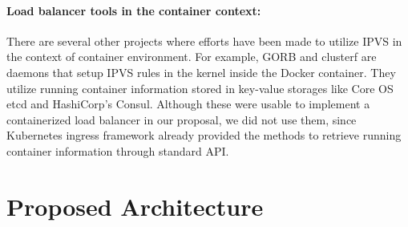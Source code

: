 \paragraph{\bf Load balancer tools in the container context:}
There are several other projects where efforts have been made to utilize IPVS in the context of container environment.
For example, GORB\cite{Sibiryov2015} and clusterf\cite{Aaltodoc:http://urn.fi/URN:NBN:fi:aalto-201611025433} are daemons 
that setup IPVS rules in the kernel inside the Docker container. 
They utilize running container information stored in key-value storages
like Core OS etcd\cite{CoreOSEtcd} and HashiCorp's Consul\cite{HashiCorpConsul}. 
Although these were usable to implement a containerized load balancer in our proposal, we did not use them, 
since Kubernetes ingress framework already provided the methods to retrieve running container information through standard API.


\section{Proposed Architecture}\label{Architecture}

